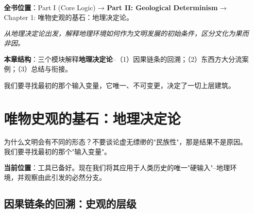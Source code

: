 \documentclass[../main.tex]{subfiles}
\begin{document}
	\textbf{\large 全书位置}：Part I (Core Logic) → \textbf{Part II: Geological Determinism} → Chapter 1: 唯物史观的基石：地理决定论。

	\textit{从地理决定论出发，解释地理环境如何作为文明发展的初始条件，区分文化为果而非因。}

	\vspace{1em}

	\textbf{\large 本章结构}：三个模块解释\textbf{地理决定论}--（1）因果链条的回溯；（2）东西方大分流案例；（3）总结与衔接。

	\vspace{1em}

我们要寻找最初的那个输入变量，它唯一、不可变更，决定了一切上层建筑。

	\chapter{唯物史观的基石：地理决定论}
	\begin{motivation}
		为什么文明会有不同的形态？不要谈论虚无缥缈的"民族性"，那是结果不是原因。
		我们要寻找最初的那个"输入变量"。
	\end{motivation}

	\begin{logicmap}
		\centering

		\vspace{1em}
		\textbf{当前位置}：工具已备好。现在我们将其应用于人类历史的唯一"硬输入"--地理环境，并观察由此引发的必然分支。
	\end{logicmap}

	\section{因果链条的回溯：史观的层级}
	
\end{document}
